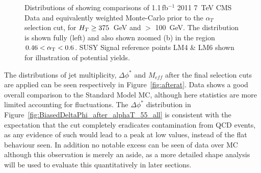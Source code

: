 \begin{figure}[htpb]
\centering
\begin{minipage}[b]{1.\textwidth}
\centering
{}
\hspace{0.2cm}
     \end{minipage}
    \caption{\label{fig:preselplotb}Distributions of \alt showing comparisons of 1.1\,fb$^{-1}$  2011 7~TeV CMS Data and equivalently weighted Monte-Carlo prior to the $\alpha_{T}$ selection cut, for $H_{T} \geq 375$~GeV and \MHT $>$ 100~GeV. The \alt distribution is shown fully (left) and also shown zoomed (b) in the region $0.46 < \alpha_{\text{T}} < 0.6$. SUSY Signal reference points LM4 \& LM6 shown for illustration of potential yields.}
\end{figure}


The distributions of jet multiplicity, $\Delta \phi^{*}$ and $M_{eff}$ after the final selection cuts are applied can be seen respectively in Figure~\ref{fig:afterat}. Data shows a good overall comparison to the Standard Model MC, although here statistics are more limited accounting for fluctuations. The $\Delta \phi^{*}$ distribution in Figure~\ref{fig:BiasedDeltaPhi_after_alphaT_55_all} is consistent with the expectation that the \alt cut completely eradicates contamination from QCD events, as any evidence of such would lead to a peak at low values, instead of the flat behaviour seen. In addition no notable excess can be seen of data over MC although this observation is merely an aside, as a more detailed shape analysis will be used to evaluate this quantitatively in later sections.

